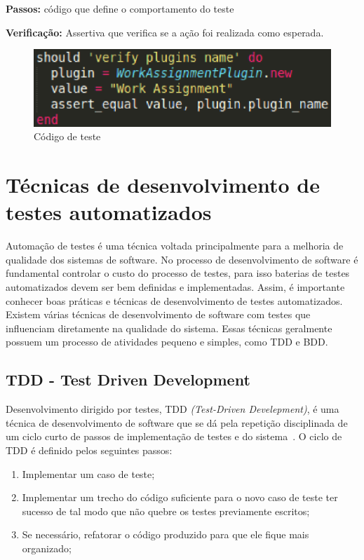 \textbf{Passos:} código que define o comportamento do teste

\textbf{Verificação:} Assertiva que verifica se a ação foi realizada como esperada.

\begin{figure}[!h]
    \centering
    \includegraphics[keepaspectratio=true,scale=0.55]
      {figuras/teste_should.eps}
    \caption{Código de teste}
    \label{noosfero_should}
\end{figure}



\section{Técnicas de desenvolvimento de testes automatizados}

Automação de testes é uma técnica voltada principalmente para a melhoria de 
qualidade dos sistemas de software. 
%
No processo de desenvolvimento de software é fundamental controlar o custo do 
processo de testes, para isso baterias de testes automatizados devem ser bem 
definidas e implementadas. Assim, é importante conhecer boas práticas e técnicas 
de desenvolvimento de testes automatizados.    
%
Existem várias técnicas de desenvolvimento de software com testes que influenciam 
diretamente na qualidade do sistema. Essas técnicas geralmente possuem um processo 
de atividades pequeno e simples, como TDD e BDD.

\subsection{TDD - Test Driven Development}

Desenvolvimento dirigido por testes, TDD \textit{(Test-Driven Develepment)}, 
é uma técnica de desenvolvimento de software que se dá pela repetição disciplinada 
de um ciclo curto de passos de implementação de testes e do sistema~\cite{koskela2007}.
%
O ciclo de TDD é definido pelos seguintes passos:
%
\begin{enumerate}
\item Implementar um caso de teste;
\item Implementar um trecho do código suficiente para o novo caso de teste ter sucesso 
de tal modo que não quebre os testes previamente escritos;
\item Se necessário, refatorar o código produzido para que ele fique mais organizado;
\end{enumerate}

